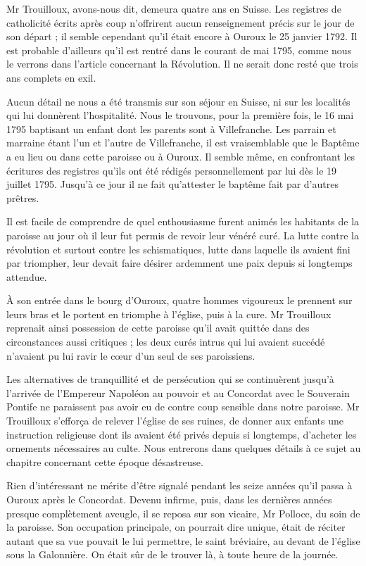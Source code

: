 Mr Trouilloux, avons-nous dit, demeura quatre ans en Suisse. Les registres de catholicité écrits après coup n'offrirent aucun renseignement précis sur le jour de son départ ; il semble cependant qu'il était encore à Ouroux le 25 janvier 1792. Il est probable d'ailleurs qu'il est rentré dans le courant de mai 1795, comme nous le verrons dans l'article concernant la Révolution. Il ne serait donc resté que trois ans complets en exil.

Aucun détail ne nous a été transmis sur son séjour en Suisse, ni sur les localités qui lui donnèrent l'hospitalité. Nous le trouvons, pour la première fois, le 16 mai 1795 baptisant un enfant dont les parents sont à Villefranche. Les parrain et marraine étant l'un et l'autre de Villefranche, il est vraisemblable que le Baptême a eu lieu ou dans cette paroisse ou à Ouroux. Il semble même, en confrontant les écritures des registres qu'ils ont été rédigés personnellement par lui dès le 19 juillet 1795. Jusqu'à ce jour il ne fait qu'attester le baptême fait par d'autres prêtres.

Il est facile de comprendre de quel enthousiasme furent animés
les habitants de la paroisse au jour où il leur fut permis de revoir leur vénéré curé. La lutte contre la révolution et surtout contre les schismatiques, lutte dans laquelle ils avaient fini par triompher, leur devait faire désirer ardemment une paix depuis si longtemps attendue.

À son entrée dans le bourg d'Ouroux, quatre hommes vigoureux le prennent sur leurs bras et le portent en triomphe à l'église, puis à la cure. Mr Trouilloux reprenait ainsi possession de cette paroisse qu'il avait quittée dans des circonstances aussi critiques ; les deux curés intrus qui lui avaient succédé n'avaient pu lui ravir le cœur d'un seul de ses paroissiens.

Les alternatives de tranquillité et de persécution qui se continuèrent jusqu'à l'arrivée de l'Empereur Napoléon au pouvoir et au Concordat avec le Souverain Pontife ne paraissent pas avoir eu de contre coup sensible dans notre paroisse. Mr Trouilloux s'efforça de relever l'église de ses ruines, de donner aux enfants une instruction religieuse dont ils avaient été privés depuis si longtemps, d'acheter les ornements nécessaires au culte. Nous entrerons dans quelques détails à ce sujet au chapitre concernant cette époque désastreuse.

Rien d'intéressant ne mérite d'être signalé pendant les seize années qu'il passa à Ouroux après le Concordat. Devenu infirme, puis, dans les dernières années presque complètement aveugle, il se reposa sur son vicaire, Mr Polloce, du soin de la paroisse. Son occupation principale, on pourrait dire unique, était de réciter autant que sa vue pouvait le lui permettre, le saint bréviaire, au devant de l'église sous la Galonnière. On était sûr de le trouver là, à toute heure de la journée.


